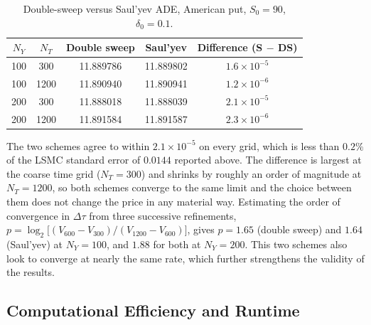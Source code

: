 \documentclass[12pt,a4paper]{article}
\begin{document}
\begin{table}[h!]
\centering
\caption{Double-sweep versus Saul'yev ADE, American put, $S_0=90$, $\delta_0=0.1$.}
\label{tab:compare}
\begin{tabular}{cc|ccc}
\hline
$N_Y$ & $N_T$ & Double sweep & Saul'yev & Difference (S $-$ DS) \\
\hline
100 & 300 & 11.889786 & 11.889802 & $1.6\times10^{-5}$ \\
100 & 1200 & 11.890940 & 11.890941 & $1.2\times10^{-6}$ \\
200 & 300 & 11.888018 & 11.888039 & $2.1\times10^{-5}$ \\
200 & 1200 & 11.891584 & 11.891587 & $2.3\times10^{-6}$ \\
\hline
\end{tabular}
\end{table}
 
The two schemes agree to within $2.1\times10^{-5}$ on every grid, which is less than $0.2\%$ of the LSMC standard error of $0.0144$ reported above. The difference is largest at the coarse time grid ($N_T=300$) and shrinks by roughly an order of magnitude at $N_T=1200$, so both schemes converge to the same limit and the choice between them does not change the price in any material way. Estimating the order of convergence in $\Delta\tau$ from three successive refinements, $p=\log_2\!\big[(V_{600}-V_{300})/(V_{1200}-V_{600})\big]$, gives $p=1.65$ (double sweep) and $1.64$ (Saul'yev) at $N_Y=100$, and $1.88$ for both at $N_Y=200$. This two schemes also look to converge at nearly the same rate, which further strengthens the validity of the results.
  
\subsection{Computational Efficiency and Runtime}\label{sec:runtime}
 
\end{document}
